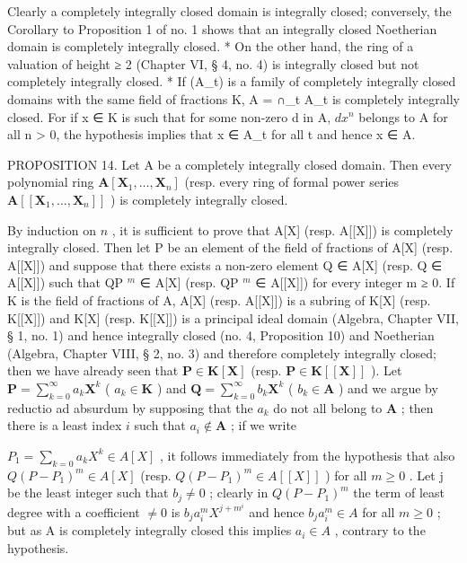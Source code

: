 Clearly a completely integrally closed domain is integrally closed; conversely, the Corollary to Proposition 1 of no. 1 shows that an integrally closed Noetherian domain is completely integrally closed. * On the other hand, the ring of a valuation of height ≥ 2 (Chapter VI, § 4, no. 4) is integrally closed but not completely integrally closed. * If (A\_t) is a family of completely integrally closed domains with the same field of fractions K, A = ∩\_t A\_t is completely integrally closed. For if x ∈ K is such that for some non-zero d in A, \(dx^n\) belongs to A for all n \textgreater{} 0, the hypothesis implies that x ∈ A\_t for all t and hence x ∈ A.

PROPOSITION 14. Let A be a completely integrally closed domain. Then every polynomial ring \(\mathbf{A}[\mathbf{X}_1,\ldots ,\mathbf{X}_n]\) (resp. every ring of formal power series \(\mathbf{A}[[\mathbf{X}_1,\dots ,\mathbf{X}_n]]\) ) is completely integrally closed.

By induction on \(n\) , it is sufficient to prove that A{[}X{]} (resp. A{[}{[}X{]}{]}) is completely integrally closed. Then let P be an element of the field of fractions of A{[}X{]} (resp. A{[}{[}X{]}{]}) and suppose that there exists a non-zero element Q ∈ A{[}X{]} (resp. Q ∈ A{[}{[}X{]}{]}) such that QP \(^{m}\) ∈ A{[}X{]} (resp. QP \(^{m}\) ∈ A{[}{[}X{]}{]}) for every integer m ≥ 0. If K is the field of fractions of A, A{[}X{]} (resp. A{[}{[}X{]}{]}) is a subring of K{[}X{]} (resp. K{[}{[}X{]}{]}) and K{[}X{]} (resp. K{[}{[}X{]}{]}) is a principal ideal domain (Algebra, Chapter VII, § 1, no. 1) and hence integrally closed (no. 4, Proposition 10) and Noetherian (Algebra, Chapter VIII, § 2, no. 3) and therefore completely integrally closed; then we have already seen that \(\mathbf{P} \in \mathbf{K}[\mathbf{X}]\) (resp. \(\mathbf{P} \in \mathbf{K}[[\mathbf{X}]]\) ). Let \(\mathbf{P} = \sum_{k=0}^{\infty} a_k \mathbf{X}^k\) ( \(a_k \in \mathbf{K}\) ) and \(\mathbf{Q} = \sum_{k=0}^{\infty} b_k \mathbf{X}^k\) ( \(b_k \in \mathbf{A}\) ) and we argue by reductio ad absurdum by supposing that the \(a_k\) do not all belong to \(\mathbf{A}\) ; then there is a least index \(i\) such that \(a_i \notin \mathbf{A}\) ; if we write

\(P_{1}=\sum_{k=0}a_{k}X^{k}\in A[X]\) , it follows immediately from the hypothesis that also \(Q(P-P_{1})^{m}\in A[X]\) (resp. \(Q(P-P_{1})^{m}\in A[[X]]\) ) for all \(m\geqslant0\) . Let j be the least integer such that \(b_{j}\neq0\) ; clearly in \(Q(P-P_{1})^{m}\) the term of least degree with a coefficient \(\neq0\) is \(b_{j}a_{i}^{m}X^{j+m^{i}}\) and hence \(b_{j}a_{i}^{m}\in A\) for all \(m\geqslant0\) ; but as A is completely integrally closed this implies \(a_{i}\in A\) , contrary to the hypothesis.

